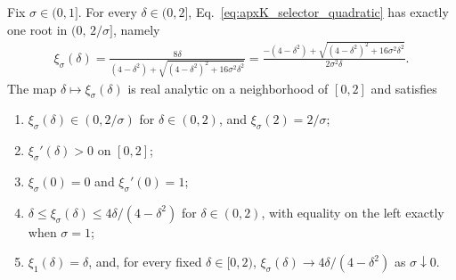 \documentclass{article}
\begin{document}
\begin{proposition}
\label{prop:xi_selector}
Fix $\sigma\in(0,1]$. For every $\delta\in(0,2]$,
Eq.~\eqref{eq:apxK_selector_quadratic} has exactly one root in
$(0,\,2/\sigma]$, namely
\begin{align}
    \xi_\sigma(\delta)
    =
    \frac{8\delta}
         {(4-\delta^2)+\sqrt{(4-\delta^2)^2+16\sigma^2\delta^2}}
    =
    \frac{-(4-\delta^2)+\sqrt{(4-\delta^2)^2+16\sigma^2\delta^2}}
         {2\sigma^2\delta}.
    \label{eq:apxK_selector}
\end{align}
The map $\delta\mapsto\xi_\sigma(\delta)$ is real analytic on a neighborhood
of $[0,2]$ and satisfies
\begin{enumerate}
    \item $\xi_\sigma(\delta)\in(0,2/\sigma)$ for $\delta\in(0,2)$, and
    $\xi_\sigma(2)=2/\sigma$;
    \item $\xi_\sigma'(\delta)>0$ on $[0,2]$;
    \item $\xi_\sigma(0)=0$ and $\xi_\sigma'(0)=1$;
    \item $\delta\le\xi_\sigma(\delta)\le 4\delta/(4-\delta^2)$ for
    $\delta\in(0,2)$, with equality on the left exactly when $\sigma=1$;
    \item $\xi_1(\delta)=\delta$, and, for every fixed $\delta\in[0,2)$,
    $\xi_\sigma(\delta)\to4\delta/(4-\delta^2)$ as $\sigma\downarrow0$.
\end{enumerate}
\end{proposition}
\end{document}
